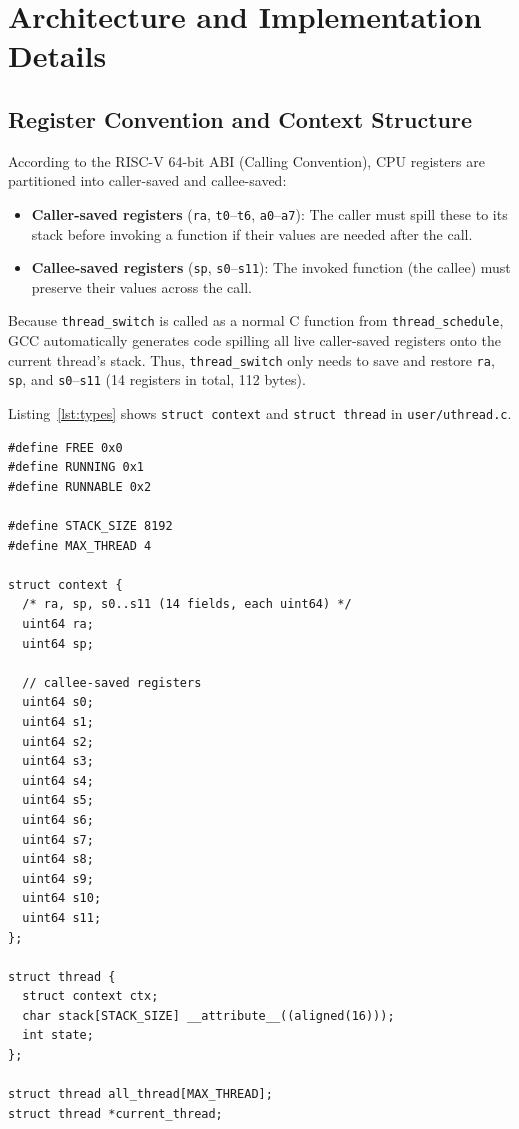 \documentclass[12pt,a4paper]{article}
\begin{document}
\section{Architecture and Implementation Details}

\subsection{Register Convention and Context Structure}
According to the RISC-V 64-bit ABI (Calling Convention), CPU registers are partitioned into caller-saved and callee-saved:
\begin{itemize}
    \item \textbf{Caller-saved registers} (\texttt{ra}, \texttt{t0}--\texttt{t6}, \texttt{a0}--\texttt{a7}): The caller must spill these to its stack before invoking a function if their values are needed after the call.
    \item \textbf{Callee-saved registers} (\texttt{sp}, \texttt{s0}--\texttt{s11}): The invoked function (the callee) must preserve their values across the call.
\end{itemize}
Because \texttt{thread\_switch} is called as a normal C function from \texttt{thread\_schedule}, GCC automatically generates code spilling all live caller-saved registers onto the current thread's stack. Thus, \texttt{thread\_switch} only needs to save and restore \texttt{ra}, \texttt{sp}, and \texttt{s0}--\texttt{s11} (14 registers in total, 112 bytes).

Listing~\ref{lst:types} shows \texttt{struct context} and \texttt{struct thread} in \texttt{user/uthread.c}.

\begin{lstlisting}[style=cstyle, caption={\texttt{struct context} and \texttt{struct thread} Definitions}, label={lst:types}]
#define FREE 0x0
#define RUNNING 0x1
#define RUNNABLE 0x2

#define STACK_SIZE 8192
#define MAX_THREAD 4

struct context {
  /* ra, sp, s0..s11 (14 fields, each uint64) */
  uint64 ra;
  uint64 sp;

  // callee-saved registers
  uint64 s0;
  uint64 s1;
  uint64 s2;
  uint64 s3;
  uint64 s4;
  uint64 s5;
  uint64 s6;
  uint64 s7;
  uint64 s8;
  uint64 s9;
  uint64 s10;
  uint64 s11;
};

struct thread {
  struct context ctx;
  char stack[STACK_SIZE] __attribute__((aligned(16)));
  int state;
};

struct thread all_thread[MAX_THREAD];
struct thread *current_thread;
\end{lstlisting}
\end{document}
